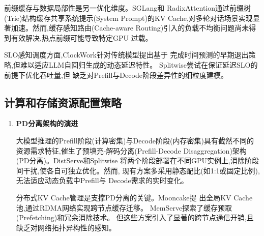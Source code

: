 前缀缓存与数据局部性是另一优化维度。SGLang\cite{zheng2024sglang}和
RadixAttention通过前缀树(Trie)结构缓存共享系统提示(System Prompt)的KV
Cache,对多轮对话场景实现显著加速。然而,缓存感知路由(Cache-aware
Routing)引入的负载不均衡问题尚未得到有效解决,热点前缀可能导致特定GPU
过载。

SLO感知调度方面,ClockWork\cite{gujarati2020serving}针对传统模型提出基于
完成时间预测的早期退出策略,但难以适应LLM自回归生成的动态延迟特性。
Splitwise\cite{patel2024splitwise}尝试在保证延迟SLO的前提下优化吞吐量,但
缺乏对Prefill与Decode阶段差异性的细粒度建模。

\subsection{计算和存储资源配置策略}

\begin{enumerate}

\item \textbf{PD分离架构的演进}

大模型推理的Prefill阶段(计算密集)与Decode阶段(内存密集)具有截然不同的
资源需求特征,催生了预填充-解码分离(Prefill-Decode Disaggregation)架构
(PD分离)。DistServe\cite{zhong2024distserve}和Splitwise\cite{patel2024splitwise}
将两个阶段部署在不同GPU实例上,消除阶段间干扰,使各自可独立优化。然而,
现有方案多采用静态配比(如1:1或固定比例),无法适应动态负载中Prefill与
Decode需求的实时变化\cite{hong2025semi,wu2024loongserve,
hu2024tetriInfer,nvidiadynamo}。

分布式KV Cache管理是支撑PD分离的关键。Mooncake\cite{qin2024mooncake}提
出全局KV Cache池,通过RDMA网络实现跨节点缓存迁移。
MemServe\cite{hu2024memserve}探索了缓存预取(Prefetching)和冗余消除技术。
但这些方案引入了显著的跨节点通信开销,且缺乏对网络拓扑异构性的感知。


\end{enumerate}
